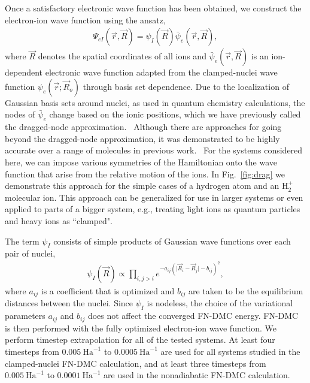 Once a satisfactory electronic wave function has been obtained, we construct the electron-ion wave function using the ansatz,
\begin{align}
\Psi_{eI}(\vec{r},\vec{R})=\psi_I(\vec{R})\bar{\psi}_e(\vec{r},\vec{R}), \label{eq:psi}
\end{align}
where $\vec{R}$ denotes the spatial coordinates of all ions and $\bar{\psi}_e(\vec{r},\vec{R})$ is an ion-dependent electronic wave function adapted from the clamped-nuclei wave function $\psi_e(\vec{r};\vec{R}_o)$ through basis set dependence. Due to the localization of Gaussian basis sets around nuclei, as used in quantum chemistry calculations, the nodes of $\bar{\psi}_e$ change based on the ionic positions, which we have previously called the dragged-node approximation.~\cite{Tubman_ECG}
Although there are approaches for going beyond the dragged-node approximation, it was demonstrated to be highly accurate over a range of molecules in previous work.~\cite{Tubman_ECG} For the systems considered here, we can impose various symmetries of the Hamiltonian onto the wave function that arise from the relative motion of the ions. In Fig.~\ref{fig:drag} we demonstrate this approach for the simple cases of a hydrogen atom and an H$_2^+$ molecular ion. This approach can be generalized for use in larger systems or even applied to parts of a bigger system, e.g., treating light ions as quantum particles and heavy ions as ``clamped".

The term $\psi_I$ consists of simple products of Gaussian wave functions over each pair of nuclei,
\begin{align}
\psi_I(\vec{R})\propto \prod\limits_{i,j>i}e^{-a_{ij}(\vert \vec{R}_i-\vec{R}_j\vert-b_{ij})^2},
\label{wfs_ions}
\end{align}
where $a_{ij}$ is a coefficient that is optimized and $b_{ij}$ are taken to be the equilibrium distances between the nuclei. Since $\psi_I$ is nodeless, the choice of the variational parameters $a_{ij}$ and $b_{ij}$ does not affect the converged FN-DMC energy. FN-DMC is then performed with the fully optimized electron-ion wave function. We perform timestep extrapolation for all of the tested systems. At least four timesteps from $0.005~\text{Ha}^{-1}$ to $0.0005~\text{Ha}^{-1}$ are used for all systems studied in the clamped-nuclei FN-DMC calculation, and at least three timesteps from $0.005~\text{Ha}^{-1}$ to $0.0001~\text{Ha}^{-1}$ are used in the nonadiabatic FN-DMC calculation.

